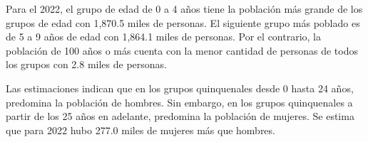 Para el 2022, el grupo de edad de 0 a 4 años tiene la población más grande de los grupos de edad con 1,870.5 miles de personas. El siguiente grupo más poblado es de 5 a 9 años de edad con 1,864.1 miles de personas. Por el contrario,  la población de 100 años o más cuenta con la menor cantidad de personas de todos los grupos con 2.8 miles de personas. 

Las estimaciones indican que en los grupos quinquenales desde 0 hasta 24 años, predomina la población de hombres. Sin embargo, en los grupos quinquenales a partir de los 25 años en adelante, predomina la población de mujeres. Se estima que para 2022 hubo 277.0 miles de mujeres más que hombres.